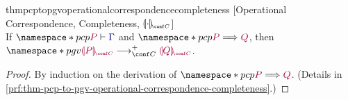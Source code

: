 \documentclass[main.tex]{subfiles}
\begin{document}
\begin{restatabletheorem}{thmpcptopgvoperationalcorrespondencecompleteness}%
  [Operational Correspondence, Completeness, $\cpgvC{\cdot}$]
  \label{thm:pcp-to-pgv-operational-correspondence-completeness}
  \hfill\\%
  If $\pcp{\seq{P}{\ty{\Gamma}}}$ and $\pcp{\tm{P}\red\tm{Q}}$,
  then $\pgv{\tm{\cpgvC{P}}\cred^+\tm{\cpgvC{Q}}}$.
\end{restatabletheorem}
\begin{proof}
  By induction on the derivation of $\pcp{\tm{P}\red\tm{Q}}$.
  (Details in \cref{prf:thm-pcp-to-pgv-operational-correspondence-completeness}.)
\end{proof}
\end{document}
